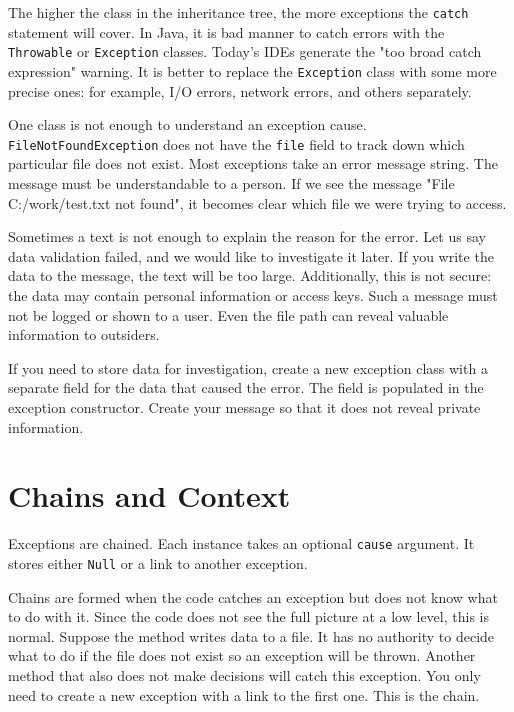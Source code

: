 The higher the class in the inheritance tree, the more exceptions the \verb|catch| statement will cover. In Java, it is bad manner to catch errors with the \verb|Throwable| or \verb|Exception| classes. Today's IDEs generate the "too broad catch expression" warning. It is better to replace the \verb|Exception| class with some more precise ones: for example, I/O errors, network errors, and others separately.

One class is not enough to understand an exception cause.
\verb|FileNotFoundException| does not have the \verb|file| field to track down which particular file does not exist. Most exceptions take an error message string. The message must be understandable to a person.
If we see the message "File C:/work/test.txt not found", it becomes clear which file we were trying to access.


Sometimes a text is not enough to explain the reason for the error. Let us say data validation failed, and we would like to investigate it later. If you write the data to the message, the text will be too large. Additionally, this is not secure: the data may contain personal information or access keys. Such a message must not be logged or shown to a user. Even the file path can reveal valuable information to outsiders.

If you need to store data for investigation, create a new exception class with a separate field for the data that caused the error. The field is populated in the exception constructor. Create your message so that it does not reveal private information.

\section{Chains and Context}


Exceptions are chained. Each instance takes an optional \verb|cause| argument. It stores either \verb|Null| or a link to another exception.



Chains are formed when the code catches an exception but does not know what to do with it. Since the code does not see the full picture at a low level, this is normal. Suppose the method writes data to a file. It has no authority to decide what to do if the file does not exist so an exception will be thrown. Another method that also does not make decisions will catch this exception. You only need to create a new exception with a link to the first one. This is the chain.


